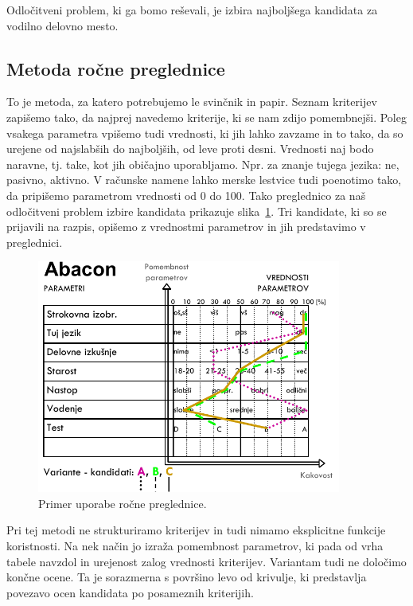 Odločitveni problem, ki ga bomo reševali, je izbira najboljšega kandidata za vodilno delovno mesto.

\subsection{Metoda ročne preglednice}

To je metoda, za katero potrebujemo le svinčnik in papir. Seznam kriterijev zapišemo tako, da najprej navedemo kriterije, ki se nam zdijo pomembnejši. Poleg vsakega parametra vpišemo tudi vrednosti, ki jih lahko zavzame in to tako, da so urejene od najslabših do najboljših, od leve proti desni. Vrednosti naj bodo naravne, tj. take, kot jih običajno uporabljamo. Npr. za znanje tujega jezika: ne, pasivno, aktivno. V računske namene lahko merske lestvice tudi poenotimo tako, da pripišemo parametrom vrednosti od 0 do 100. Tako preglednico za naš odločitveni problem izbire kandidata prikazuje slika~\ref{f-rocna-preglednica}. Tri kandidate, ki so se prijavili na razpis, opišemo z vrednostmi parametrov in jih predstavimo v preglednici.

\begin{figure}[htbp]
\begin{center}
\includegraphics[width=10cm]{slike/rocna-preglednica.pdf}
\caption{Primer uporabe ročne preglednice.}
\label{f-rocna-preglednica}
\end{center}
\end{figure}

Pri tej metodi ne strukturiramo kriterijev in tudi nimamo eksplicitne funkcije koristnosti. Na nek način jo izraža pomembnost parametrov, ki pada od vrha tabele navzdol in urejenost zalog vrednosti kriterijev. Variantam tudi ne določimo končne ocene. Ta je sorazmerna s površino levo od krivulje, ki predstavlja povezavo ocen kandidata po posameznih kriterijih.

